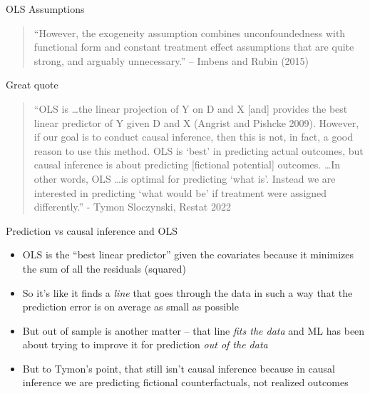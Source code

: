 \documentclass{beamer}
\begin{document}
\begin{frame}{OLS Assumptions}

\begin{quote}
``However, the exogeneity assumption combines unconfoundedness with functional form and constant treatment effect assumptions that are quite strong, and arguably unnecessary.'' -- Imbens and Rubin (2015)
\end{quote}

\end{frame}

\begin{frame}{Great quote}

\begin{quote}
``OLS is \dots the linear projection of Y on D and X [and] provides the best linear predictor of Y given D and X (Angrist and Pishcke 2009).  However, if our goal is to conduct causal inference, then this is not, in fact, a good reason to use this method.  OLS is `best' in predicting actual outcomes, but causal inference is about predicting [fictional potential] outcomes.  \dots In other words, OLS \dots is optimal for predicting `what is'.  Instead we are interested in predicting `what would be' if treatment were assigned differently.'' - Tymon Sloczynski, Restat 2022
\end{quote}

\end{frame}




\begin{frame}{Prediction vs causal inference and OLS}




\begin{itemize}
\item OLS is the ``best linear predictor'' given the covariates because it minimizes the sum of all the residuals (squared)
\item So it's like it finds a \emph{line} that goes through the data in such a way that the prediction error is on average as small as possible
\item But out of sample is another matter -- that line \emph{fits the data} and ML has been about trying to improve it for prediction \emph{out of the data}
\item But to Tymon's point, that still isn't causal inference because in causal inference we are predicting fictional counterfactuals, not realized outcomes

\end{itemize}

\end{frame}
\end{document}
